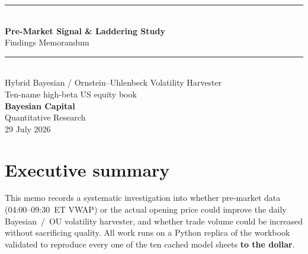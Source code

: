 \documentclass[11pt]{article}
\begin{document}
\begin{titlepage}
\vspace*{1.2cm}
{\color{bcgold}\rule{\textwidth}{2pt}}\\[0.4cm]
{\color{bcnavy}\Huge\bfseries Pre-Market Signal \& Laddering Study}\\[0.35cm]
{\color{bcblue}\LARGE Findings Memorandum}\\[0.5cm]
{\color{bcgold}\rule{\textwidth}{1pt}}\\[0.6cm]
{\large\color{bcgrey} Hybrid Bayesian / Ornstein--Uhlenbeck Volatility Harvester}\\[0.2cm]
{\large\color{bcgrey} Ten-name high-beta US equity book}\\[1.2cm]
{\color{bcnavy}\large\bfseries Bayesian Capital}\\[0.15cm]
{\color{bcgrey} Quantitative Research}\\[0.15cm]
{\color{bcgrey} 29 July 2026}\\[2cm]

\end{titlepage}

\section{Executive summary}

This memo records a systematic investigation into whether pre-market data (04:00--09:30~ET
VWAP) or the actual opening price could improve the daily Bayesian~/~OU volatility
harvester, and whether trade volume could be increased without sacrificing quality. All work
runs on a Python replica of the workbook validated to reproduce every one of the ten cached
model sheets \textbf{to the dollar}.
\end{document}
